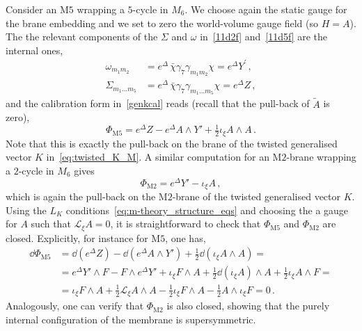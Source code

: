 \documentclass[debug]{phd}
\begin{document}
Consider an $\mathrm{M}5$ wrapping a $5$-cycle in $M_6$. 
We choose again the static gauge for the brane embedding and we set to zero the world-volume gauge field (so $H = A$). 
The the relevant components of the $\Sigma$ and $\omega$ in~\eqref{11d2f} and~\eqref{11d5f} are the internal ones,
%
	\begin{subequations}
		\begin{align}
			\omega_{m_1 m_2} &= e^\Delta \, \bar{\chi}\gamma_7 \gamma_{m_1 m_2} \chi = e^\Delta Y^\prime \, , \\
			\Sigma_{m_1 \ldots m_5} &= e^\Delta \, \bar{\chi}\gamma_7 \gamma_{m_1 \ldots m_5} \chi = e^\Delta Z \, , 
		\end{align}
	\end{subequations}
%
and the calibration form in~\eqref{genkcal} reads (recall that the pull-back of $\tilde A$ is zero),
%
	\begin{equation}
		\Phi_{\mathrm{M}5} = e^{\Delta} Z -e^{\Delta} A \wedge Y' + \tfrac{1}{2}\iota_{\xi} A\wedge A \, . 
	\end{equation}
%
Note that this is exactly the pull-back on the brane of the twisted generalised vector $K$ in~\eqref{eq:twisted_K_M}. 
A similar computation for an $\mathrm{M}2$-brane wrapping a $2$-cycle in $M_6$ gives
%
	\begin{equation}
		\Phi_{\mathrm{M}2} = e^{\Delta} Y' - \iota_{\xi} A \, ,
	\end{equation}
%
which is again the pull-back on the $\mathrm{M}2$-brane of the twisted generalised vector $K$.
Using the $L_K$ conditions~\eqref{eq:m-theory_structure_eqs} and choosing the a gauge for $A$ such that 
$\mathcal{L}_\xi A =0$, it is straightforward to check that $\Phi_{\mathrm{M}5}$ and $\Phi_{\mathrm{M}2}$ are closed.
Explicitly, for instance for $\mathrm{M}5$, one has,
%
	\begin{equation}
		\begin{split}
			\dd  \Phi_{\mathrm{M}5} &= \dd  (e^{\Delta} Z ) - \dd  (e^{\Delta} A \wedge Y') + \tfrac{1}{2}\dd (\iota_{\xi} A\wedge A) = \\
					&= e^{\Delta} Y' \wedge F - F \wedge e^\Delta Y' + \iota_\xi F \wedge A + \tfrac{1}{2}\dd (\iota_\xi A)\wedge A + \tfrac{1}{2}\iota_\xi A \wedge F = \\
					&= \iota_\xi F \wedge A + \tfrac{1}{2} \mathcal{L}_\xi A \wedge A - \tfrac{1}{2}\iota_\xi F \wedge A - \tfrac{1}{2} A \wedge \iota_\xi F = 0\, .
		\end{split}
	\end{equation}
%
Analogously, one can verify that $\Phi_{\mathrm{M}2}$ is also closed, showing that the purely internal configuration of the membrane is supersymmetric.
%
\end{document}
